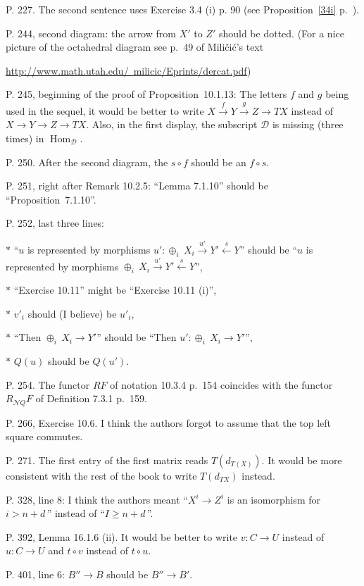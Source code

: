 \documentclass[12pt]{article}
\theoremstyle{remark}%
\newcommand{\n}{\noindent}
\newcommand{\cc}{\mathcal}
\newcommand{\xr}{\xrightarrow}
\newcommand{\pr}{Proposition}
\DeclareMathOperator{\h}{Hom}
\begin{document}
\n P. 227. The second sentence uses Exercise 3.4 (i) p. 90 (see Proposition~\ref{34i} p.~\pageref{34i}). 

\n P. 244, second diagram: the arrow from $X'$ to $Z'$ should be dotted. (For a nice picture of the octahedral diagram see p.~49 of Mili\v{c}i\'c's text 

\href{http://www.math.utah.edu/~milicic/Eprints/dercat.pdf}{http://www.math.utah.edu/~milicic/Eprints/dercat.pdf})

\n P. 245, beginning of the proof of \pr\ 10.1.13: The letters $f$ and $g$ being used in the sequel, it would be better to write $X\xr fY\xr gZ\to TX$ instead of $X\to Y\to Z\to TX$. Also, in the first display, the subscript $\cc D$ is missing (three times) in $\h_{\cc D}$. 

\n P. 250. After the second diagram, the $s\circ f$ should be an $f\circ s$. 

\n P. 251, right after Remark 10.2.5: ``Lemma 7.1.10'' should be ``\pr\ 7.1.10''.

\n P. 252, last three lines: 

$*$ ``$u$ is represented by morphisms $u':\oplus_i\ X_i\xr{u'}Y'\xleftarrow sY$'' should be ``$u$ is represented by morphisms $\oplus_i\ X_i\xr{u'}Y'\xleftarrow sY$'', 

$*$ ``Exercise 10.11'' might be ``Exercise 10.11 (i)'',

$*$ $v'_i$ should (I believe) be $u'_i$, 

$*$ ``Then $\oplus_i\ X_i\to Y'$'' should be ``Then $u':\oplus_i\ X_i\to Y'$'', 

$*$ $Q(u)$ should be $Q(u')$. 

\n P. 254. The functor $RF$ of notation 10.3.4 p.~154 coincides with the functor $R_{\cc NQ}F$ of Definition 7.3.1 p.~159.

\n P. 266, Exercise 10.6. I think the authors forgot to assume that the top left square commutes. 

\n P. 271. The first entry of the first matrix reads $T(d_{T(X)})$. It would be more consistent with the rest of the book to write $T(d_{TX})$ instead. 

\n P. 328, line 8: I think the authors meant ``$X^i\to Z^i$ is an isomorphism for $i>n+d\,$'' instead of ``$I\ge n+d\,$''. 

\n P. 392, Lemma 16.1.6 (ii). It would be better to write $v:C\to U$ instead of $u:C\to U$ and $t\circ v$ instead of $t\circ u$. 

\n P. 401, line 6: $B''\to B$ should be $B''\to B'$.
\end{document}
